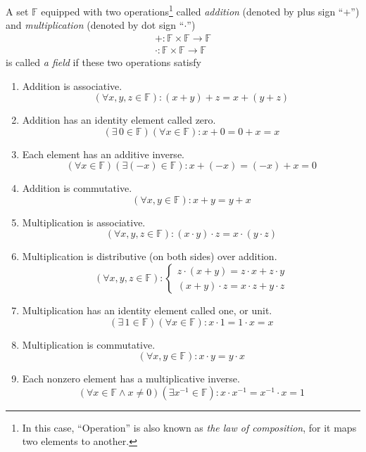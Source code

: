 \begin{definition}[Field]
	A set $\mathbb{F}$ equipped with two operations\footnote{In this case, ``Operation'' is also known as \textit{the law of composition}, for it maps two elements to another.} called \textit{addition} (denoted by plus sign ``$+$'') and \textit{multiplication} (denoted by dot sign ``$\cdot$'')
	\[
		\begin{split}
			+: \mathbb{F}\times\mathbb{F}\to\mathbb{F} \\
			\cdot: \mathbb{F}\times\mathbb{F}\to\mathbb{F}
		\end{split}
	\]
	is called \textit{a field} if these two operations satisfy
	\begin{enumerate}[label = (\arabic*)]
		\item Addition is associative.\label{field:addition-associative}
		      \[
			      (\forall x, y, z\in\mathbb{F}): (x + y) + z = x + (y + z)
		      \]
		\item Addition has an identity element called zero.\label{field:additive-identity}
		      \[
			      (\exists\,0\in\mathbb{F})(\forall x\in\mathbb{F}): x + 0 = 0 + x = x
		      \]
		\item Each element has an additive inverse.\label{field:additive-inverse}
		      \[
			      (\forall x\in\mathbb{F})(\exists (-x)\in\mathbb{F}): x + (-x) = (-x) + x = 0
		      \]
		\item Addition is commutative.\label{field:addition-commutative}
		      \[
			      (\forall x,y\in\mathbb{F}): x + y = y + x
		      \]
		\item Multiplication is associative.\label{field:multiplication-association}
		      \[
			      (\forall x, y, z\in\mathbb{F}): (x\cdot y)\cdot z = x\cdot (y\cdot z)
		      \]
		\item Multiplication is distributive (on both sides) over addition.\label{field:distributive}
		      \[
			      (\forall x, y, z\in\mathbb{F}):
			      \begin{cases}
				      z\cdot (x + y) = z\cdot x + z\cdot y \\
				      (x + y)\cdot z = x\cdot z + y\cdot z
			      \end{cases}
		      \]
		\item Multiplication has an identity element called one, or unit.\label{field:multiplication-identity}
		      \[
			      (\exists\,1\in\mathbb{F})(\forall x\in\mathbb{F}): x\cdot 1 = 1\cdot x = x
		      \]
		\item Multiplication is commutative.\label{field:multiplication-commutative}
		      \[
			      (\forall x, y\in\mathbb{F}): x\cdot y = y\cdot x
		      \]
		\item Each nonzero element has a multiplicative inverse.\label{field:multiplicative-inverse}
		      \[
			      (\forall x\in\mathbb{F} \wedge x\ne 0)(\exists x^{-1}\in\mathbb{F}): x\cdot x^{-1} = x^{-1}\cdot x = 1
		      \]
	\end{enumerate}
\end{definition}

